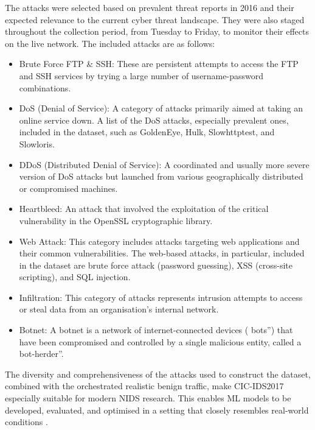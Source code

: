 The attacks were selected based on prevalent threat reports in 2016 and their expected relevance to the current cyber threat landscape. They were also staged throughout the collection period, from Tuesday to Friday, to monitor their effects on the live network. The included attacks are as follows: 
\begin{itemize}[noitemsep] 
\item Brute Force FTP \& SSH: These are persistent attempts to access the FTP and SSH services by trying a large number of username-password combinations.
\item DoS (Denial of Service): A category of attacks primarily aimed at taking an online service down. A list of the DoS attacks, especially prevalent ones, included in the dataset, such as GoldenEye, Hulk, Slowhttptest, and Slowloris.
\item DDoS (Distributed Denial of Service): A coordinated and usually more severe version of DoS attacks but launched from various geographically distributed or compromised machines.
\item Heartbleed: An attack that involved the exploitation of the critical vulnerability in the OpenSSL cryptographic library.
\item Web Attack: This category includes attacks targeting web applications and their common vulnerabilities. The web-based attacks, in particular, included in the dataset are brute force attack (password guessing), XSS (cross-site scripting), and SQL injection.
\item Infiltration: This category of attacks represents intrusion attempts to access or steal data from an organisation's internal network.
\item Botnet: A botnet is a network of internet-connected devices ( bots'') that have been compromised and controlled by a single malicious entity, called a bot-herder''.
\end{itemize} 
The diversity and comprehensiveness of the attacks used to construct the dataset, combined with the orchestrated realistic benign traffic, make CIC-IDS2017 especially suitable for modern NIDS research. This enables ML models to be developed, evaluated, and optimised in a setting that closely resembles real-world conditions \parencite {al2022cicids}.


